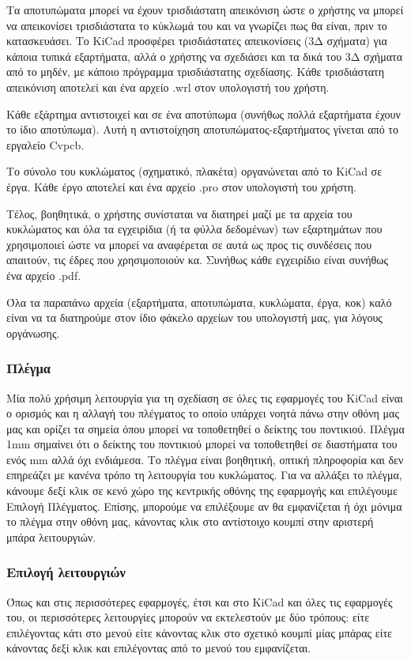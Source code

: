 \documentclass[a4paper]{article}
\begin{document}
Τα αποτυπώματα μπορεί να έχουν τρισδιάστατη απεικόνιση ώστε ο χρήστης να μπορεί να απεικονίσει τρισδιάστατα το κύκλωμά του και να γνωρίζει πως θα είναι, πριν το κατασκευάσει. Το \textenglish{KiCad} προσφέρει τρισδιάστατες απεικονίσεις (3Δ σχήματα) για κάποια τυπικά εξαρτήματα, αλλά ο χρήστης να σχεδιάσει και τα δικά του 3Δ σχήματα από το μηδέν, με κάποιο πρόγραμμα τρισδιάστατης σχεδίασης. Κάθε τρισδιάστατη απεικόνιση αποτελεί και ένα αρχείο .wrl στον υπολογιστή του χρήστη. 

Κάθε εξάρτημα αντιστοιχεί και σε ένα αποτύπωμα (συνήθως πολλά εξαρτήματα έχουν το ίδιο αποτύπωμα). Αυτή η αντιστοίχηση αποτυπώματος-εξαρτήματος γίνεται από το εργαλείο \textenglish{Cvpcb}.

Το σύνολο του κυκλώματος (σχηματικό, πλακέτα) οργανώνεται από το \textenglish{KiCad} σε έργα. Κάθε έργο αποτελεί και ένα αρχείο .pro στον υπολογιστή του χρήστη. 

Τέλος, βοηθητικά, ο χρήστης συνίσταται να διατηρεί μαζί με τα αρχεία του κυκλώματος και όλα τα εγχειρίδια (ή τα φύλλα δεδομένων) των εξαρτημάτων που χρησιμοποιεί ώστε να μπορεί να αναφέρεται σε αυτά ως προς τις συνδέσεις που απαιτούν, τις έδρες που χρησιμοποιούν κα. Συνήθως κάθε εγχειρίδιο είναι συνήθως ένα αρχείο .pdf.

Όλα τα παραπάνω αρχεία (εξαρτήματα, αποτυπώματα, κυκλώματα, έργα, κοκ) καλό είναι να τα διατηρούμε στον ίδιο φάκελο αρχείων του υπολογιστή μας, για λόγους οργάνωσης.  

\subsubsection{Πλέγμα}
Mία πολύ χρήσιμη λειτουργία για τη σχεδίαση σε όλες τις εφαρμογές του \textenglish{KiCad} είναι ο ορισμός και η αλλαγή του πλέγματος το οποίο υπάρχει νοητά πάνω στην οθόνη μας μας και ορίζει τα σημεία όπου μπορεί να τοποθετηθεί ο δείκτης του ποντικιού. Πλέγμα 1mm σημαίνει ότι ο δείκτης του ποντικιού μπορεί να τοποθετηθεί σε διαστήματα του ενός mm αλλά όχι ενδιάμεσα. Το πλέγμα είναι βοηθητική, οπτική πληροφορία και δεν επηρεάζει με κανένα τρόπο τη λειτουργία του κυκλώματος. Για να αλλάξει το πλέγμα, κάνουμε δεξί κλικ σε κενό χώρο της κεντρικής οθόνης της εφαρμογής και επιλέγουμε Επιλογή Πλέγματος. Επίσης, μπορούμε να επιλέξουμε αν θα εμφανίζεται ή όχι μόνιμα το πλέγμα στην οθόνη μας, κάνοντας κλικ στο αντίστοιχο κουμπί στην αριστερή μπάρα λειτουργιών.

\subsubsection{Επιλογή λειτουργιών}
Όπως και στις περισσότερες εφαρμογές, έτσι και στο \textenglish{KiCad} και όλες τις εφαρμογές του, οι περισσότερες λειτουργίες μπορούν να εκτελεστούν με δύο τρόπους: είτε επιλέγοντας κάτι στο μενού είτε κάνοντας κλικ στο σχετικό κουμπί μίας μπάρας είτε κάνοντας δεξί κλικ και επιλέγοντας από το μενού του εμφανίζεται.
\end{document}
